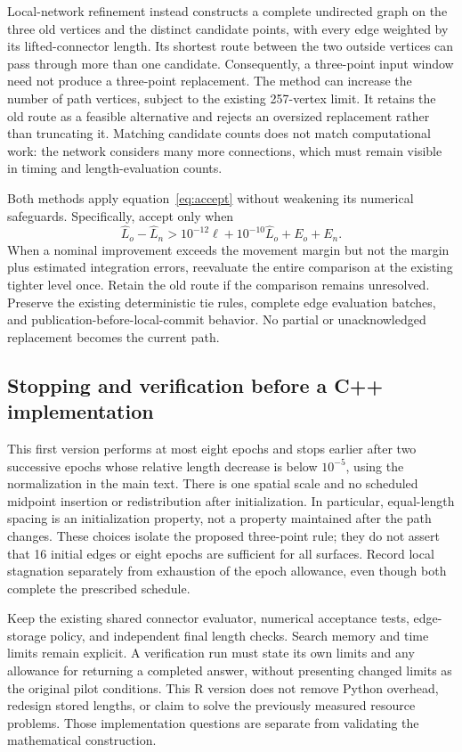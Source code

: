 \documentclass[11pt,letterpaper]{article}
\begin{document}
Local-network refinement instead constructs a complete undirected graph on
the three old vertices and the distinct candidate points, with every edge
weighted by its lifted-connector length. Its shortest route between the two
outside vertices can pass through more than one candidate. Consequently, a
three-point input window need not produce a three-point replacement. The
method can increase the number of path vertices, subject to the existing
257-vertex limit. It retains the old route as a feasible alternative and
rejects an oversized replacement rather than truncating it. Matching candidate
counts does not match computational work: the network considers many more
connections, which must remain visible in timing and length-evaluation counts.

Both methods apply equation~\eqref{eq:accept} without weakening its numerical
safeguards. Specifically, accept only when
\[
 \widehat L_o-\widehat L_n>
 10^{-12}\ell+10^{-10}\widehat L_o+E_o+E_n.
\]
When a nominal improvement exceeds the movement margin but not the margin
plus estimated integration errors, reevaluate the entire comparison at the
existing tighter level once. Retain the old route if the comparison remains
unresolved. Preserve the existing deterministic tie rules, complete edge
evaluation batches, and publication-before-local-commit behavior. No partial
or unacknowledged replacement becomes the current path.

\subsection{Stopping and verification before a C++ implementation}

This first version performs at most eight epochs and stops earlier after two
successive epochs whose relative length decrease is below $10^{-5}$, using
the normalization in the main text. There is one spatial scale and no scheduled
midpoint insertion or redistribution after initialization. In particular,
equal-length spacing is an initialization property, not a property maintained
after the path changes. These choices isolate the proposed three-point rule;
they do not assert that 16 initial edges or eight epochs are sufficient for
all surfaces. Record local stagnation separately from exhaustion of the epoch
allowance, even though both complete the prescribed schedule.

Keep the existing shared connector evaluator, numerical acceptance tests,
edge-storage policy, and independent final length checks. Search memory and
time limits remain explicit. A verification run must state its own limits
and any allowance for returning a completed answer, without presenting changed
limits as the original pilot conditions. This R version does not remove Python
overhead, redesign stored lengths, or claim to solve the previously measured
resource problems. Those implementation questions are separate from validating
the mathematical construction.
\end{document}
